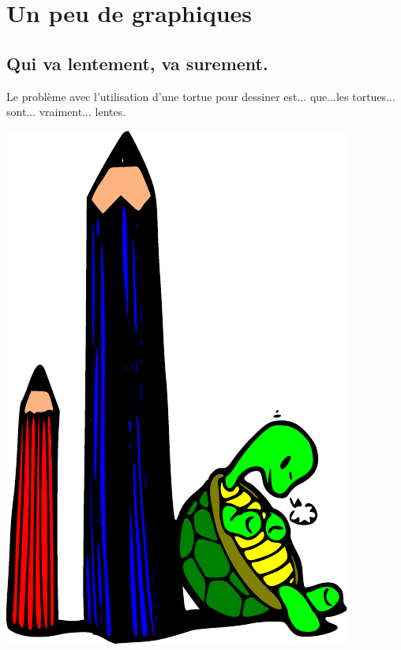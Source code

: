 


\chapter{Un peu de graphiques}
\section{Qui va lentement, va surement.}
Le problème avec l'utilisation d'une tortue pour dessiner est... que...\hspace{0.5cm}les tortues...\hspace{1cm}\\
sont...\hspace{2cm} vraiment... \hspace{4cm} lentes.


\begin{center}
\includegraphics[scale=1]{images/tortue}
\end{center}

